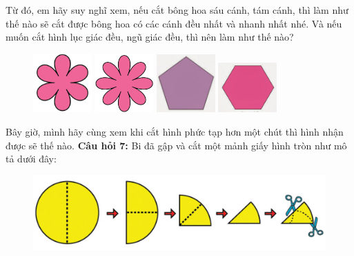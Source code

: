 Từ đó, em hãy suy nghĩ xem, nếu cắt bông hoa sáu cánh, tám cánh, thì làm như thế nào sẽ cắt được bông hoa có các cánh đều nhất và nhanh nhất nhé. Và nếu muốn cắt hình lục giác đều, ngũ giác đều, thì nên làm như thế nào? 
\begin{figure}[H]
	\centering
	\captionsetup{labelformat=empty}
	\captionsetup{justification=centering}
	\includegraphics[width =0.2\textwidth]{cat-16a}
	\hfill
	\includegraphics[width =0.2\textwidth]{cat-16b}
	\hfill
	\includegraphics[width =0.2\textwidth]{cat-16c}
	\hfill
	\includegraphics[width =0.2\textwidth]{cat-16d}	
	\vspace*{-5pt}
\end{figure}
Bây giờ, mình hãy cùng xem khi cắt hình phức tạp hơn một chút thì hình nhận được sẽ thế nào.
\vskip0.3cm
\textbf{Câu hỏi $\pmb{7}$:} Bi đã gập và cắt một mảnh giấy hình tròn như mô tả dưới đây:
\begin{figure}[H]
	\vspace*{-5pt}	
	\captionsetup{labelformat=empty}
	\centering
	\captionsetup{justification=raggedleft}
	\includegraphics[width =1\textwidth]{cat-17}
	\vspace*{-10pt}
\end{figure}

